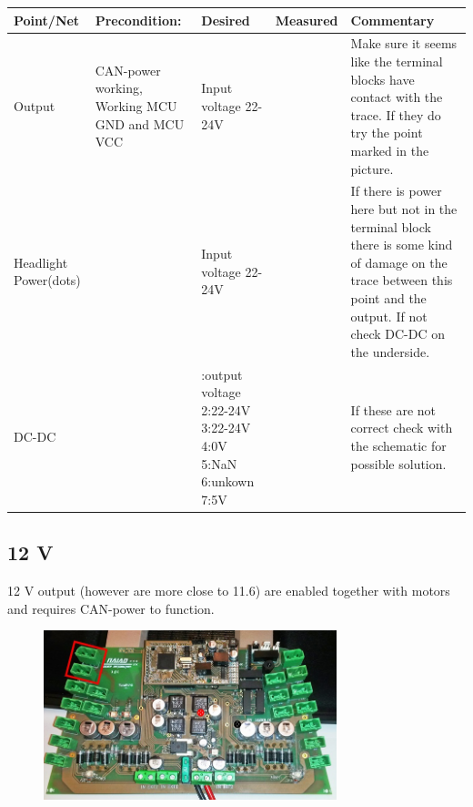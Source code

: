 \begin{table}[ht]
\begin{tabularx}{\textwidth}{|>{\hsize=0.6\hsize}X|>{\hsize=0.8\hsize}X|>{\hsize=0.8\hsize}X|c|>{\hsize=1.8\hsize}X|}
\hline
Point/Net & Precondition: & Desired & Measured & Commentary \\ 
\hline
Output & CAN-power working, Working MCU GND and MCU VCC & Input voltage 22-24V &   & Make sure it seems like the terminal blocks have contact with the trace. If they do try the point marked in the picture. \\ 
\hline 
Headlight Power(dots) &  & Input voltage 22-24V &    & If there is power here but not in the terminal block there is some kind of damage on the trace between this point and the output. If not check DC-DC on the underside. \\ 
\hline 
DC-DC &  & 	1:output voltage 2:22-24V 3:22-24V 4:0V 5:NaN 6:unkown 7:5V &   & If these are not correct check with the schematic for possible solution.  \\ 
\hline 
\end{tabularx}
\end{table}

\newpage
\subsection{12 V}
12 V output (however are more close to 11.6) are enabled together with motors and requires CAN-power to function. 
\begin{figure}[!ht]
	\begin{center}
		\includegraphics[width=0.76\textwidth]{./Images/Unit_test_power_board/12v.jpg}
		\label{motor_pwr}
	\end{center}
\end{figure}


